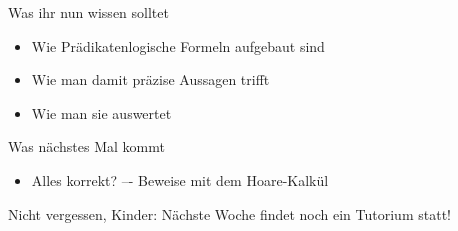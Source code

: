 \begin{frame}
	\begin{block}{Was ihr nun wissen solltet}
		\begin{itemize}
			\item Wie Prädikatenlogische Formeln aufgebaut sind
			\item Wie man damit präzise Aussagen trifft
			\item Wie man sie auswertet
		\end{itemize}
	\end{block}
	
	\begin{block}{Was nächstes Mal kommt}
		\begin{itemize}
			\item Alles korrekt? –- Beweise mit dem Hoare-Kalkül
		\end{itemize}
	\end{block}
\end{frame}

\begin{frame}[plain]
	\begin{center}
		\large
		Nicht vergessen, Kinder: Nächste Woche findet noch ein Tutorium statt! \smiley
	\end{center}
\end{frame}






 \backupend

